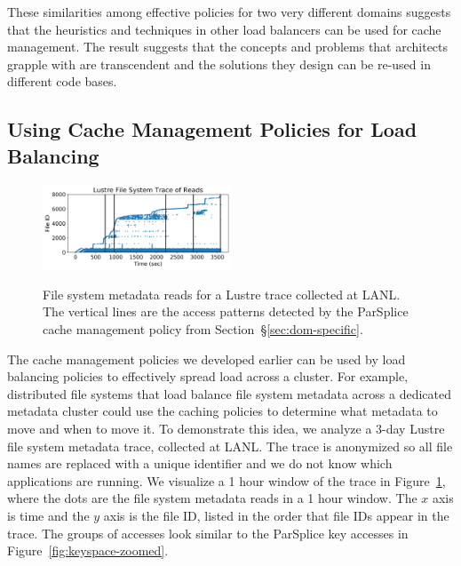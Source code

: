 These similarities among effective policies for two very different domains
suggests that the heuristics and techniques in other load balancers can be used
for cache management. The result suggests that the concepts and problems that
architects grapple with are transcendent and the solutions they design can be
re-used in different code bases.

\subsection{Using Cache Management Policies for Load Balancing}

\begin{figure}[t]
\noindent\includegraphics[width=0.5\textwidth]{figures/trace-atime.png}\\
\caption{File system metadata reads for a Lustre trace collected at LANL. The
vertical lines are the access patterns detected by the ParSplice cache
management policy from Section~\S\ref{sec:dom-specific}.
\label{fig:trace-atime}}
\end{figure}


The cache management policies we developed earlier can be used by load
balancing policies to effectively spread load across a cluster. For example,
distributed file systems that load balance file system metadata across a
dedicated metadata cluster could use the caching policies to determine what
metadata to move and when to move it.  To demonstrate this idea, we analyze a
3-day Lustre file system metadata trace, collected at LANL.  The trace is
anonymized so all file names are replaced with a unique identifier and we do
not know which applications are running. We visualize a 1 hour window of the
trace in Figure~\ref{fig:trace-atime}, where the dots are the file system
metadata reads in a 1 hour window.  The \(x\) axis is time and the \(y\) axis
is the file ID, listed in the order that file IDs appear in the trace.  The
groups of accesses look similar to the ParSplice key accesses in
Figure~\ref{fig:keyspace-zoomed}. 

